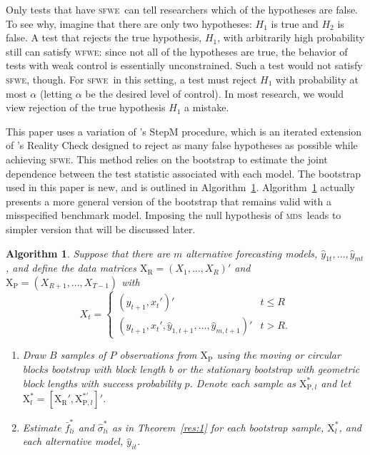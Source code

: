 \documentclass[10pt,fleqn,draft]{article}
\newcommand\citepos[2][]{\citeauthor{#2}'s \citeyearpar[#1]{#2}}
\newtheorem{alg}{Algorithm}
\theoremstyle{definition}
\newcommand{\X}{\ensuremath{\mathrm{X}}}
\newcommand{\R}{\ensuremath{\mathrm{R}}}
\newcommand{\p}{\ensuremath{\mathrm{P}}}
\newcommand{\mds}{\textsc{mds}}
\newcommand{\sfwe}{\textsc{sfwe}}
\newcommand{\wfwe}{\textsc{wfwe}}
\begin{document}
Only tests that have \sfwe\ can tell researchers which of the
hypotheses are false.  To see why, imagine that there are only two
hypotheses: $H_1$ is true and $H_2$ is false.  A test that rejects the
true hypothesis, $H_1$, with arbitrarily high probability still can
satisfy \wfwe: since not all of the hypotheses are true, the behavior
of tests with weak control is essentially unconstrained.  Such a test
would not satisfy \sfwe, though.  For \sfwe\ in this setting, a test
must reject $H_1$ with probability at most $\alpha$ (letting $\alpha$
be the desired level of control).  In most research, we would view
rejection of the true hypothesis $H_1$ a mistake.

This paper uses a variation of \citepos{RoW:05} StepM procedure, which
is an iterated extension of \citepos{Whi:00} Reality Check designed to
reject as many false hypotheses as possible while achieving \sfwe.
This method relies on the bootstrap to estimate the joint dependence
between the test statistic associated with each model.  The bootstrap
used in this paper is new, and is outlined in Algorithm~\ref{alg:1}.
Algorithm~\ref{alg:1} actually presents a more general version of the
bootstrap that remains valid with a misspecified benchmark model.
Imposing the null hypothesis of \mds\ leads to simpler version that
will be discussed later.
\begin{alg}\label{alg:1}
  Suppose that there are $m$ alternative forecasting models,
  $\hat{y}_{1t},\dots, \hat{y}_{mt}$, and define the data matrices
  $\X_\R = (X_1,\dots,X_R)'$ and $\X_{\p} = (X_{R+1},\dots,X_{T-1})$
  with
  \begin{equation*}
    X_t = \begin{cases}
      (y_{t+1}, x_t')' & t \leq R \\
      (y_{t+1}, x_t', \hat{y}_{1,t+1}, \dots, \hat{y}_{m,t+1})' & t > R.
    \end{cases}
  \end{equation*}
  \begin{enumerate}
  \item Draw $B$ samples of $P$ observations from $\X_{\p}$ using the
    moving or circular blocks bootstrap with block length $b$ or the
    stationary bootstrap with geometric block lengths with success
    probability $p$.  Denote each sample as $\X_{\p, l}^{*}$ and let
    $\X_l^{*} = [\X_{\R}', \X_{\p,l}^{*\prime}]'$.
  \item Estimate $\bar{f}^{*}_{li}$ and $\hat{\sigma}_{li}^{*}$ as in
    Theorem~\ref{res:1} for each bootstrap sample, $\X^{*}_l$, and each
    alternative model, $\hat{y}_{it}$.
  \end{enumerate}
\end{alg}
\end{document}
